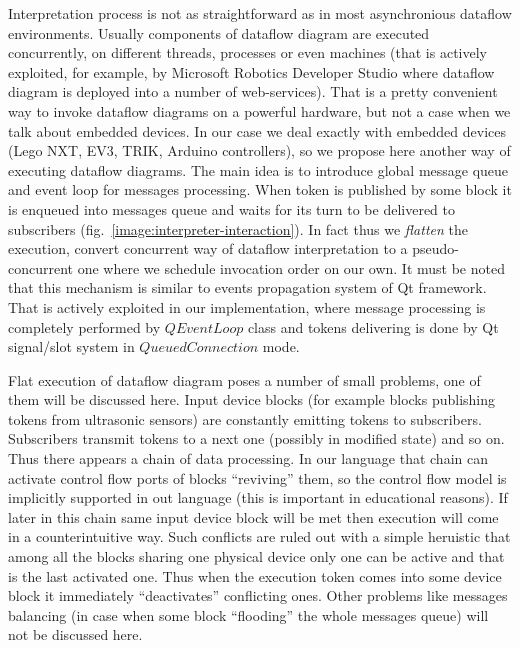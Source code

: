 \documentclass[conference,compsoc]{IEEEtran}
\begin{document}
Interpretation process is not as straightforward as in most asynchronious dataflow environments. Usually components of dataflow diagram are executed concurrently, on different threads, processes or even machines (that is actively exploited, for example, by Microsoft Robotics Developer Studio where dataflow diagram is deployed into a number of web-services). That is a pretty convenient way to invoke dataflow diagrams on a powerful hardware, but not a case when we talk about embedded devices. In our case we deal exactly with embedded devices (Lego NXT, EV3, TRIK, Arduino controllers), so we propose here another way of executing dataflow diagrams. The main idea is to introduce global message queue and event loop for messages processing. When token is published by some block it is enqueued into messages queue and waits for its turn to be delivered to subscribers (fig.~\ref{image:interpreter-interaction}). In fact thus we \textit{flatten} the execution, convert concurrent way of dataflow interpretation to a pseudo-concurrent one where we schedule invocation order on our own. It must be noted that this mechanism is similar to events propagation system of Qt framework. That is actively exploited in our implementation, where message processing is completely performed by $QEventLoop$ class and tokens delivering is done by Qt signal/slot system in $QueuedConnection$ mode. 

Flat execution of dataflow diagram poses a number of small problems, one of them will be discussed here. Input device blocks (for example blocks publishing tokens from ultrasonic sensors) are constantly emitting tokens to subscribers. Subscribers transmit tokens to a next one (possibly in modified state) and so on. Thus there appears a chain of data processing. In our language that chain can activate control flow ports of blocks ``reviving'' them, so the control flow model is implicitly supported in out language (this is important in educational reasons). If later in this chain same input device block will be met then execution will come in a 
counterintuitive way. Such conflicts are ruled out with a simple heruistic that among all the blocks sharing one physical device only one can be active and that is the last activated one. Thus when the execution token comes into some device block it immediately ``deactivates'' conflicting ones. Other problems like messages balancing (in case when some block ``flooding'' the whole messages queue) will not be discussed here.
\end{document}
